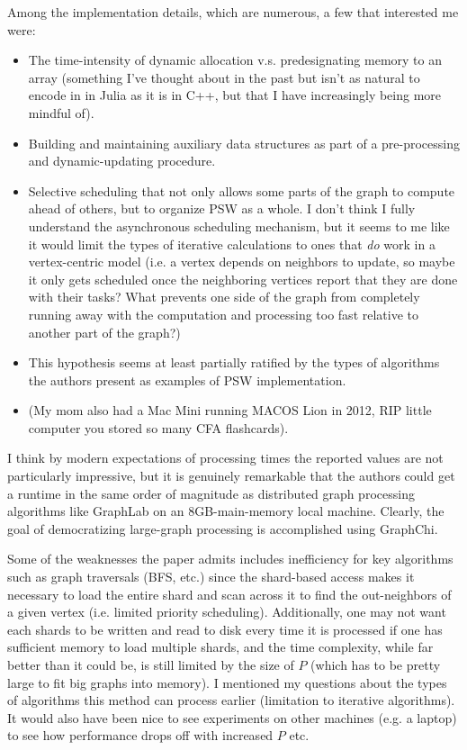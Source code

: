 Among the implementation details, which are numerous, a few that interested me were:
\begin{itemize}
    \item The time-intensity of dynamic allocation v.s. predesignating memory to an array (something I've thought about in the past but isn't as natural to encode in in Julia as it is in C++, but that I have increasingly being more mindful of).
    \item Building and maintaining auxiliary data structures as part of a pre-processing and dynamic-updating procedure.
    \item Selective scheduling that not only allows some parts of the graph to compute ahead of others, but to organize PSW as a whole. I don't think I fully understand the asynchronous scheduling mechanism, but it seems to me like it would limit the types of iterative calculations to ones that \textit{do} work in a vertex-centric model (i.e. a vertex depends on neighbors to update, so maybe it only gets scheduled once the neighboring vertices report that they are done with their tasks? What prevents one side of the graph from completely running away with the computation and processing too fast relative to another part of the graph?)
    \item This hypothesis seems at least partially ratified by the types of algorithms the authors present as examples of PSW implementation.
    \item (My mom also had a Mac Mini running MACOS Lion in 2012, RIP little computer you stored so many CFA flashcards).
\end{itemize}

I think by modern expectations of processing times the reported values are not particularly impressive, but it is genuinely remarkable that the authors could get a runtime in the same order of magnitude as distributed graph processing algorithms like GraphLab on an 8GB-main-memory local machine. Clearly, the goal of democratizing large-graph processing is accomplished using GraphChi.

Some of the weaknesses the paper admits includes inefficiency for key algorithms such as graph traversals (BFS, etc.) since the shard-based access makes it necessary to load the entire shard and scan across it to find the out-neighbors of a given vertex (i.e. limited priority scheduling). Additionally, one may not want each shards to be written and read to disk every time it is processed if one has sufficient memory to load multiple shards, and the time complexity, while far better than it could be, is still limited by the size of $P$ (which has to be pretty large to fit big graphs into memory). I mentioned my questions about the types of algorithms this method can process earlier (limitation to iterative algorithms). It would also have been nice to see experiments on other machines (e.g. a laptop) to see how performance drops off with increased $P$ etc.
